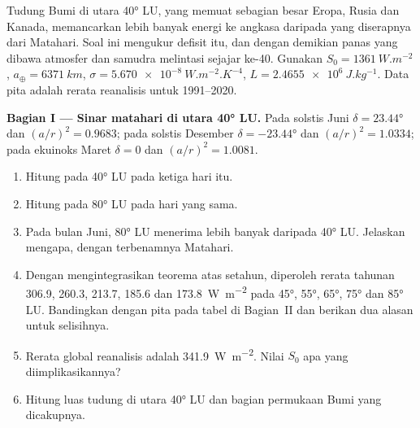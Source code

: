 \begin{problem}
\label{pb:b1:radiation-heat-transport:1}
Tudung Bumi di utara \ang{40} LU, yang memuat sebagian besar Eropa, Rusia dan Kanada,
memancarkan lebih banyak energi ke angkasa daripada yang diserapnya dari Matahari.
Soal ini mengukur defisit itu, dan dengan demikian panas yang dibawa atmosfer dan samudra
melintasi sejajar ke-40. Gunakan $S_0 = \qty{1361}{W.m^{-2}}$,
$a_\oplus = \qty{6371}{km}$, $\sigma = \qty{5.670e-8}{W.m^{-2}.K^{-4}}$, $L =
\qty{2.4655e6}{J.kg^{-1}}$. Data pita adalah rerata reanalisis untuk 1991--2020.

\medskip
\noindent\textbf{Bagian I --- Sinar matahari di utara \ang{40} LU.} Pada solstis Juni
$\delta = \ang{23.44}$ dan $(a/r)^2 = 0.9683$; pada solstis Desember $\delta =
\ang{-23.44}$ dan $(a/r)^2 = 1.0334$; pada ekuinoks Maret $\delta = 0$ dan
$(a/r)^2 = 1.0081$.
\begin{enumerate}
  \item Hitung  pada \ang{40} LU pada ketiga hari itu.
  \item Hitung pada \ang{80} LU pada hari yang sama.
  \item Pada bulan Juni, \ang{80} LU menerima lebih banyak daripada \ang{40} LU. Jelaskan
        mengapa, dengan  terbenamnya Matahari.
  \item Dengan mengintegrasikan teorema atas setahun, diperoleh rerata tahunan
        \qty{306.9}{}, \qty{260.3}{}, \qty{213.7}{}, \qty{185.6}{} dan
        \qty{173.8}{W.m^{-2}} pada \ang{45}, \ang{55}, \ang{65}, \ang{75} dan
        \ang{85} LU. Bandingkan dengan  pita pada tabel di Bagian~II dan
        berikan dua alasan untuk selisihnya.
  \item Rerata  global reanalisis adalah \qty{341.9}{W.m^{-2}}. Nilai
        $S_0$ apa yang diimplikasikannya?
  \item Hitung luas tudung di utara \ang{40} LU dan bagian permukaan Bumi yang
        dicakupnya.
\end{enumerate}


\end{problem}
